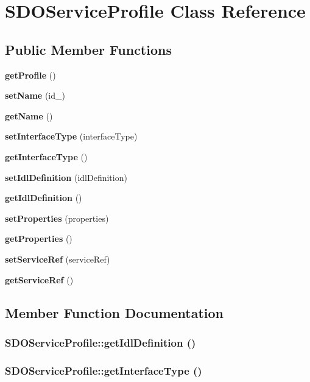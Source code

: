 \section{SDOService\-Profile Class Reference}
\label{classSDOServiceProfile}
\subsection*{Public Member Functions}
\begin{CompactItemize}
\item 
{\bf get\-Profile} ()
\item 
{\bf set\-Name} (id\_\-)
\item 
{\bf get\-Name} ()
\item 
{\bf set\-Interface\-Type} (interface\-Type)
\item 
{\bf get\-Interface\-Type} ()
\item 
{\bf set\-Idl\-Definition} (idl\-Definition)
\item 
{\bf get\-Idl\-Definition} ()
\item 
{\bf set\-Properties} (properties)
\item 
{\bf get\-Properties} ()
\item 
{\bf set\-Service\-Ref} (service\-Ref)
\item 
{\bf get\-Service\-Ref} ()
\end{CompactItemize}


\subsection{Member Function Documentation}
\subsubsection{\setlength{\rightskip}{0pt plus 5cm}SDOService\-Profile::get\-Idl\-Definition ()}\label{classSDOServiceProfile_SDOServiceProfilea6}


\subsubsection{\setlength{\rightskip}{0pt plus 5cm}SDOService\-Profile::get\-Interface\-Type ()}\label{classSDOServiceProfile_SDOServiceProfilea4}


